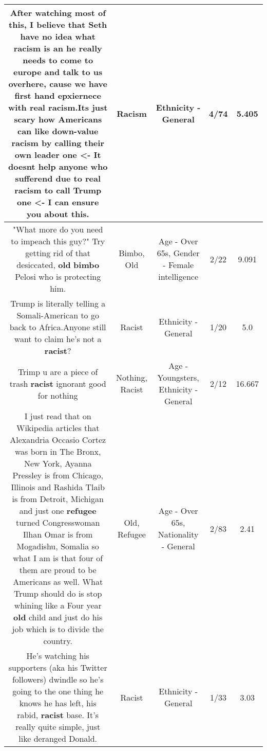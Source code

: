 \documentclass[11pt]{article}
\newlength\mylength
\begin{document}
\begin{center}
\begin{longtable}{|C{.65\mylength}|C{.30\mylength}|C{.12\mylength}|C{.12\mylength}|C{.12\mylength}|}
  \small After watching most of this, I believe that Seth have no idea what \textbf{racism} is an he really needs to come to europe and talk to us overhere, cause we have first hand epxiernece with real \textbf{racism}.Its just scary how Americans can like down-value \textbf{racism} by calling their own leader one <- It doesnt help anyone who sufferend due to real \textbf{racism} to call Trump one <- I can ensure you about this.\normalsize   & Racism & Ethnicity - General & 4/74 & 5.405 \\  \hline
  \small "What more do you need to impeach this guy?" Try getting rid of that desiccated, \textbf{old} \textbf{bimbo} Pelosi who is protecting him.\normalsize   & Bimbo, Old & Age - Over 65s, Gender - Female intelligence & 2/22 & 9.091 \\  \hline
  \small Trump is literally telling a Somali-American to go back to Africa.Anyone still want to claim he's not a \textbf{racist}?\normalsize   & Racist & Ethnicity - General & 1/20 & 5.0 \\  \hline
  \small Trimp u are a piece of trash \textbf{racist} ignorant good for nothing\normalsize   & Nothing, Racist & Age - Youngsters, Ethnicity - General & 2/12 & 16.667 \\  \hline
  \small I just read that on Wikipedia articles that Alexandria Occasio Cortez was born in The Bronx, New York, Ayanna Pressley is from Chicago, Illinois and Rashida Tlaib is from Detroit, Michigan and just one \textbf{refugee} turned Congresswoman Ilhan Omar is from Mogadishu, Somalia so what I am is that four of them are proud to be Americans as well. What Trump should do is stop whining like a Four year \textbf{old} child and just do his job which is to divide the country.\normalsize   & Old, Refugee & Age - Over 65s, Nationality - General & 2/83 & 2.41 \\  \hline
  \small He's watching his supporters (aka his Twitter followers) dwindle so he's going to the one thing he knows he has left, his rabid, \textbf{racist} base. It's really quite simple, just like deranged Donald.\normalsize   & Racist & Ethnicity - General & 1/33 & 3.03 \\  \hline

\end{longtable}
\end{center}
\end{document}
